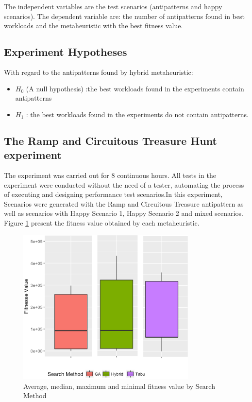 \documentclass[espaco=umemeio,chapter=TITLE,twoside,openright]{abnt}
\begin{document}
The independent variables are the test scenarios (antipatterns and happy scenarios). The dependent variable are: the number of antipatterns found in best workloads and the metaheuristic with the best fitness value.

\subsection{Experiment Hypotheses}

With regard to the antipatterns found by hybrid metaheuristic:
\begin{itemize}
\item $H_{0}$ (A null hypothesis) :the best workloads found in the experiments contain antipatterns
\item $H_{1}$  : the best workloads found in the experiments do not contain antipatterns.
\end{itemize}

\subsection{The Ramp and Circuitous Treasure Hunt experiment}

The experiment was carried out for 8 continuous hours.  All tests in the experiment were conducted without the need of a tester, automating the process of executing and designing performance test scenarios.In this experiment, Scenarios were generated with the Ramp and Circuitous Treasure antipattern as well as scenarios with Happy Scenario 1, Happy Scenario 2 and mixed scenarios. Figure \ref{fig:boxplot1} present the fitness value obtained by each metaheuristic.

\begin{figure}[h]
\centering
\includegraphics[width=0.8\textwidth]{./images/antipattern1.png}
\caption{Average, median, maximum and minimal fitness value by Search Method}
\label{fig:boxplot1}
\end{figure}
\end{document}
